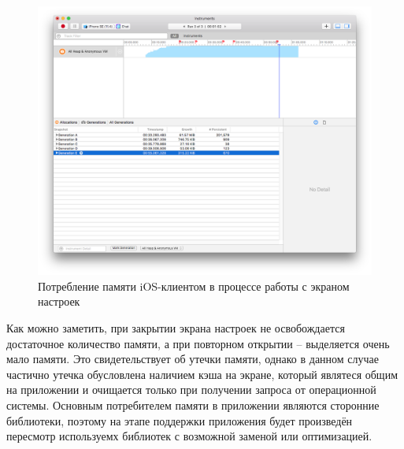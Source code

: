 \begin{figure}[h]
  \centering
    \includegraphics[width=1\textwidth]{inc/img/memory_generations.png}
  \caption{Потребление памяти iOS-клиентом в процессе работы с экраном настроек}
  \label{sec:eng:memory:generations}
\end{figure}

Как можно заметить, при закрытии экрана настроек не освобождается достаточное количество памяти, а при повторном открытии -- выделяется очень мало памяти. Это свидетельствует об утечки памяти, однако в данном случае частично утечка обусловлена наличием кэша на экране, который являтеся общим на приложении и очищается только при получении запроса от операционной системы. Основным потребителем памяти в приложении являются сторонние библиотеки, поэтому на этапе поддержки приложения будет произведён пересмотр используемх библиотек с возможной заменой или оптимизацией.